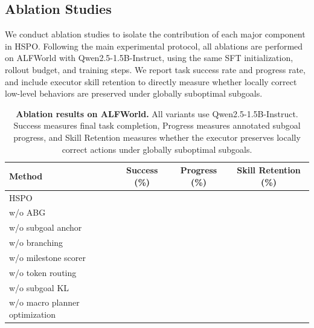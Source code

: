 \documentclass{article}
\begin{document}
\subsection{Ablation Studies}
\label{sec:ablations}

We conduct ablation studies to isolate the contribution of each major component in HSPO. Following the main experimental protocol, all ablations are performed on ALFWorld with Qwen2.5-1.5B-Instruct, using the same SFT initialization, rollout budget, and training steps. We report task success rate and progress rate, and include executor skill retention to directly measure whether locally correct low-level behaviors are preserved under globally suboptimal subgoals.

\begin{table}[t]
\centering
\small
\setlength{\tabcolsep}{5pt}
\renewcommand{\arraystretch}{1.08}
\begin{tabular}{l|ccc}
\toprule
\textbf{Method}
& \textbf{Success (\%)}
& \textbf{Progress (\%)}
& \textbf{Skill Retention (\%)} \\
\midrule
HSPO
&  &  &  \\
\quad w/o ABG
&  &  &  \\
\quad w/o subgoal anchor
&  &  &  \\
\quad w/o branching
&  &  &  \\
\quad w/o milestone scorer
&  &  &  \\
\quad w/o token routing
&  &  &  \\
\quad w/o subgoal KL
&  &  &  \\
\quad w/o macro planner optimization
&  &  &  \\
\bottomrule
\end{tabular}
\caption{\textbf{Ablation results on ALFWorld.}
All variants use Qwen2.5-1.5B-Instruct. Success measures final task completion, Progress measures annotated subgoal progress, and Skill Retention measures whether the executor preserves locally correct actions under globally suboptimal subgoals.}
\label{tab:ablation}
\end{table}
\end{document}
